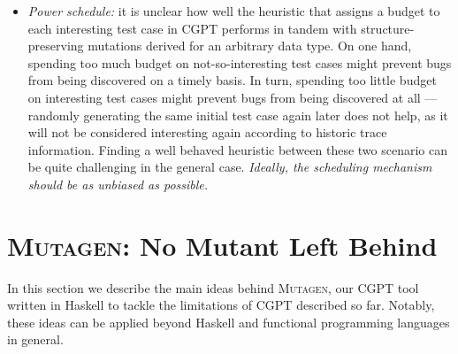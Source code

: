 \documentclass[sigconf,review,anonymous]{acmart}
\newcommand{\mutagen}{\textsc{Mutagen}\xspace}
\begin{document}
\begin{itemize}
\item \emph{Power schedule:}
%
it is unclear how well the heuristic that assigns a budget to each interesting
test case in CGPT performs in tandem with structure-preserving mutations derived
for an arbitrary data type.
%
On one hand, spending too much budget on not-so-interesting test cases might
prevent bugs from being discovered on a timely basis.
%
In turn, spending too little budget on interesting test cases might prevent bugs
from being discovered at all --- randomly generating the same initial test case
again later does not help, as it will not be considered interesting again
according to historic trace information.
%
Finding a well behaved heuristic between these two scenario can be quite
challenging in the general case. 
%
\emph{Ideally, the scheduling mechanism should be as unbiased as possible.}

%

\end{itemize}




\section{\mutagen: No Mutant Left Behind}
\label{sec:mutagen}

In this section we describe the main ideas behind \mutagen, our CGPT tool
written in Haskell to tackle the limitations of CGPT described so far.
%
Notably, these ideas can be applied beyond Haskell and functional programming
languages in general.
%
\end{document}

